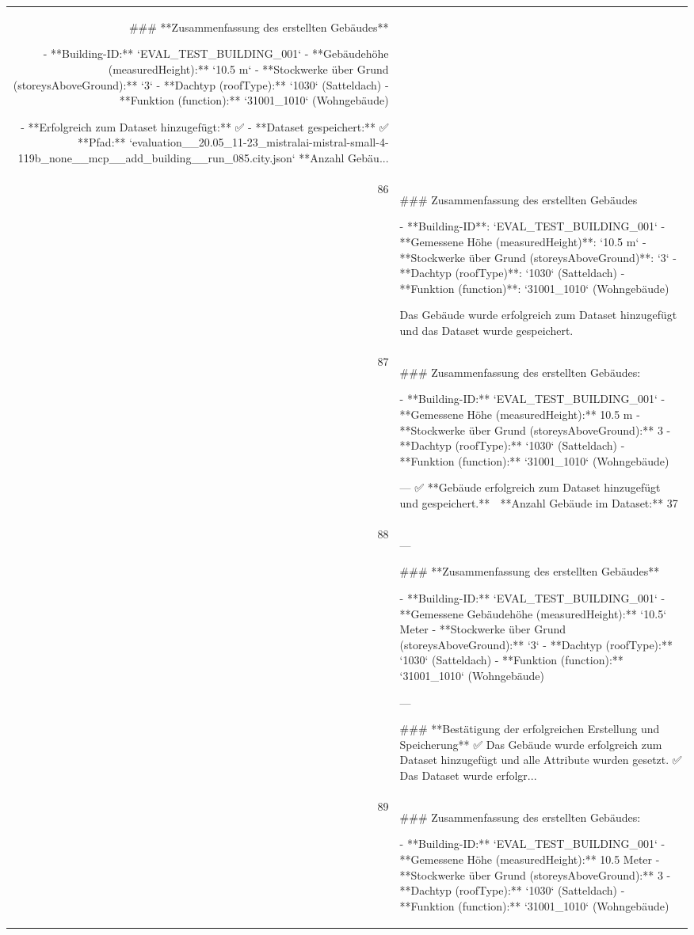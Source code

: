 \documentclass[a4paper,11pt]{article}
\begin{document}
\begin{table}[ht]
\begin{tabular}{r p{12cm}}
\#\#\# **Zusammenfassung des erstellten Gebäudes**

- **Building-ID:** `EVAL\_TEST\_BUILDING\_001`
- **Gebäudehöhe (measuredHeight):** `10.5 m`
- **Stockwerke über Grund (storeysAboveGround):** `3`
- **Dachtyp (roofType):** `1030` (Satteldach)
- **Funktion (function):** `31001\_1010` (Wohngebäude)

- **Erfolgreich zum Dataset hinzugefügt:** ✅
- **Dataset gespeichert:** ✅
  **Pfad:** `evaluation\_\_20.05\_11-23\_mistralai-mistral-small-4-119b\_none\_\_mcp\_\_add\_building\_\_run\_085.city.json`
  **Anzahl Gebäu... \\
86 & \#\#\# Zusammenfassung des erstellten Gebäudes

- **Building-ID**: `EVAL\_TEST\_BUILDING\_001`
- **Gemessene Höhe (measuredHeight)**: `10.5 m`
- **Stockwerke über Grund (storeysAboveGround)**: `3`
- **Dachtyp (roofType)**: `1030` (Satteldach)
- **Funktion (function)**: `31001\_1010` (Wohngebäude)

Das Gebäude wurde erfolgreich zum Dataset hinzugefügt und das Dataset wurde gespeichert. \\
87 & \#\#\# Zusammenfassung des erstellten Gebäudes:

- **Building-ID:** `EVAL\_TEST\_BUILDING\_001`
- **Gemessene Höhe (measuredHeight):** 10.5 m
- **Stockwerke über Grund (storeysAboveGround):** 3
- **Dachtyp (roofType):** `1030` (Satteldach)
- **Funktion (function):** `31001\_1010` (Wohngebäude)

---
✅ **Gebäude erfolgreich zum Dataset hinzugefügt und gespeichert.**
🔹 **Anzahl Gebäude im Dataset:** 37 \\
88 & ---

\#\#\# **Zusammenfassung des erstellten Gebäudes**

- **Building-ID:** `EVAL\_TEST\_BUILDING\_001`
- **Gemessene Gebäudehöhe (measuredHeight):** `10.5` Meter
- **Stockwerke über Grund (storeysAboveGround):** `3`
- **Dachtyp (roofType):** `1030` (Satteldach)
- **Funktion (function):** `31001\_1010` (Wohngebäude)

---

\#\#\# **Bestätigung der erfolgreichen Erstellung und Speicherung**
✅ Das Gebäude wurde erfolgreich zum Dataset hinzugefügt und alle Attribute wurden gesetzt.
✅ Das Dataset wurde erfolgr... \\
89 & \#\#\# Zusammenfassung des erstellten Gebäudes:

- **Building-ID:** `EVAL\_TEST\_BUILDING\_001`
- **Gemessene Höhe (measuredHeight):** 10.5 Meter
- **Stockwerke über Grund (storeysAboveGround):** 3
- **Dachtyp (roofType):** `1030` (Satteldach)
- **Funktion (function):** `31001\_1010` (Wohngebäude)


\end{tabular}
\end{table}
\end{document}
